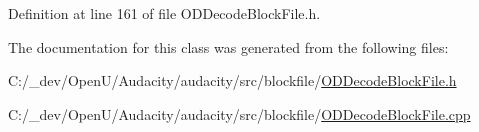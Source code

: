 Definition at line 161 of file O\+D\+Decode\+Block\+File.\+h.



The documentation for this class was generated from the following files\+:\begin{DoxyCompactItemize}
\item 
C\+:/\+\_\+dev/\+Open\+U/\+Audacity/audacity/src/blockfile/\hyperlink{_o_d_decode_block_file_8h}{O\+D\+Decode\+Block\+File.\+h}\item 
C\+:/\+\_\+dev/\+Open\+U/\+Audacity/audacity/src/blockfile/\hyperlink{_o_d_decode_block_file_8cpp}{O\+D\+Decode\+Block\+File.\+cpp}\end{DoxyCompactItemize}
